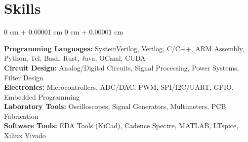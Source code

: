 \documentclass[10pt, letterpaper]{article}
\newenvironment{onecolentry}{
    \begin{adjustwidth}{
        0 cm + 0.00001 cm
    }{
        0 cm + 0.00001 cm
    }
}{
    \end{adjustwidth}
}
\begin{document}
        \vspace{0.10 cm}

    \section{Skills}
        \begin{onecolentry}
            \textbf{Programming Languages:} SystemVerilog, Verilog, C/C++, ARM Assembly, Python, Tcl, Bash, Rust, Java, OCaml, CUDA \\
            \textbf{Circuit Design:} Analog/Digital Circuits, Signal Processing, Power Systems, Filter Design \\
            \textbf{Electronics:} Microcontrollers, ADC/DAC, PWM, SPI/I2C/UART, GPIO, Embedded Programming \\
            \textbf{Laboratory Tools:} Oscilloscopes, Signal Generators, Multimeters, PCB Fabrication \\
            \textbf{Software Tools:} EDA Tools (KiCad), Cadence Spectre, MATLAB, LTspice, Xilinx Vivado
        \end{onecolentry}
\end{document}
